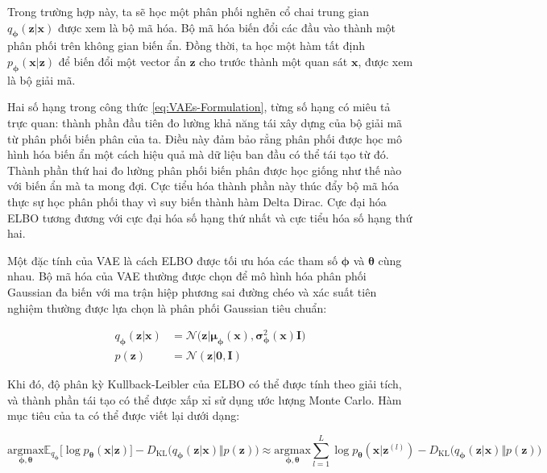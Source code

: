 \documentclass[14pt, a4paper]{article}
\numberwithin{equation}{section}
\numberwithin{figure}{section}
\numberwithin{dl}{section}
\numberwithin{md}{section}
\numberwithin{bd}{section}
\numberwithin{dn}{section}
\numberwithin{hq}{section}
\begin{document}
    Trong trường hợp này, ta sẽ học một phân phối nghẽn cổ chai trung gian $q_{\boldsymbol{\phi}} (\boldsymbol{z} \vert \boldsymbol{x})$ được xem là bộ mã hóa.
    Bộ mã hóa biến đổi các đầu vào thành một phân phối trên không gian biến ẩn.
    Đồng thời, ta học một hàm tất định $p_{\boldsymbol{\phi}} (\boldsymbol{x} \vert \boldsymbol{z})$ để biến đổi một vector ẩn $\boldsymbol{z}$ cho trước thành một quan sát $\boldsymbol{x}$, được xem là bộ giải mã.

    Hai số hạng trong công thức \ref{eq:VAEs-Formulation}, từng số hạng có miêu tả trực quan: thành phần đầu tiên đo lường khả năng tái xây dựng của bộ giải mã từ phân phối biến phân của ta.
    Điều này đảm bảo rẳng phân phối được học mô hình hóa biến ẩn một cách hiệu quả mà dữ liệu ban đầu có thể tái tạo từ đó.
    Thành phần thứ hai đo lường phân phối biến phân được học giống như thế nào với biến ẩn mà ta mong đợi.
    Cực tiểu hóa thành phần này thúc đẩy bộ mã hóa thực sự học phân phối thay vì suy biến thành hàm Delta Dirac.
    Cực đại hóa ELBO tương đương với cực đại hóa số hạng thứ nhất và cực tiểu hóa số hạng thứ hai.

    Một đặc tính của VAE là cách ELBO được tối ưu hóa các tham số $\boldsymbol{\phi}$ và $\boldsymbol{\theta}$ cùng nhau.
    Bộ mã hóa của VAE thường được chọn để mô hình hóa phân phối Gaussian đa biến với ma trận hiệp phương sai đường chéo và xác suất tiên nghiệm thường được lựa chọn là phân phối Gaussian tiêu chuẩn:

    \begin{equation}
        \begin{aligned}
            q_{\boldsymbol{\phi}} (\boldsymbol{z} \vert \boldsymbol{x}) &= \mathcal{N} \big( \boldsymbol{z} \vert \boldsymbol{\mu}_{\boldsymbol{\phi}} (\boldsymbol{x}), \boldsymbol{\sigma}_{\boldsymbol{\phi}}^2 (\boldsymbol{x}) \boldsymbol{I} \big) \\
            p(\boldsymbol{z}) &= \mathcal{N} (\boldsymbol{z} \vert \boldsymbol{0}, \boldsymbol{I})
        \end{aligned}
    \end{equation}

    Khi đó, độ phân kỳ Kullback-Leibler của ELBO có thể được tính theo giải tích, và thành phần tái tạo có thể được xấp xỉ sử dụng ước lượng Monte Carlo.
    Hàm mục tiêu của ta có thể được viết lại dưới dạng:

    \begin{equation}
        \underset{\boldsymbol{\phi}, \boldsymbol{\theta}}{\mathrm{argmax}} \mathbb{E}_{q_{\boldsymbol{\phi}}} \lbrack \log p_{\boldsymbol{\theta}} (\boldsymbol{x} \vert \boldsymbol{z}) \rbrack - D_{\mathrm{KL}} \big( q_{\boldsymbol{\phi}} (\boldsymbol{z} \vert \boldsymbol{x}) \Vert p(\boldsymbol{z}) \big) \approx \underset{\boldsymbol{\phi}, \boldsymbol{\theta}}{\mathrm{argmax}} \sum_{l=1}^L \log p_{\boldsymbol{\theta}} (\boldsymbol{x} \vert \boldsymbol{z}^{(l)}) - D_{\mathrm{KL}} \big( q_{\boldsymbol{\phi}} (\boldsymbol{z} \vert \boldsymbol{x}) \Vert p(\boldsymbol{z}) \big)
    \end{equation}
\end{document}
